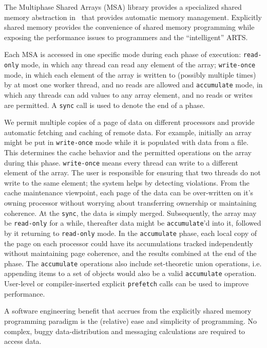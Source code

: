 
The Multiphase Shared Arrays (MSA) library provides a specialized
shared memory abstraction in \charmpp\ that provides automatic memory management.
Explicitly shared memory
provides the convenience of shared memory programming while exposing
the performance issues to programmers and the ``intelligent'' ARTS.

\newcommand{\accu}{\texttt{accumulate}\xspace }
\newcommand{\wo}{\texttt{write-once}\xspace }
\newcommand{\ro}{\texttt{read-only}\xspace }
\newcommand{\sync}{\texttt{sync}\xspace }
\newcommand{\pref}{\texttt{prefetch}\xspace }

Each MSA is accessed in one specific mode
during each phase of execution:
\ro mode, in which any thread can read
any element of the array;
\wo mode, in
which each element of the array is written to (possibly multiple
times) by at most one worker thread, and no reads are allowed
and \accu mode, in which any threads can add values to any array
element, and no reads or writes are permitted.
A \sync call is used to denote the end of a phase.

We permit multiple copies of a page of data on different
processors and provide automatic fetching and caching of remote data.
For example, initially an array might be put in
\wo mode while it is populated with data from a file.
This determines the cache
behavior and the
permitted operations on the array during this phase.
\wo means every thread can write to a different element of the array.
The user is responsible for ensuring that two threads do not write to
the same element; the system helps by detecting violations.
From the cache maintenance viewpoint, each
page of the data can be over-written on it's owning processor without
worrying about transferring ownership or maintaining coherence.
At the \sync, the data is simply merged.
Subsequently, the array may be \ro for a while, thereafter data
might be \accu'd into it, followed by it returning to \ro mode.  In
the \accu phase, each local copy of the page on each processor could
have its accumulations tracked independently without maintaining page
coherence, and the results combined at the end of the phase.
The \accu operations also include set-theoretic union
operations, i.e. appending items to a set of objects would also be a
valid \accu operation.
User-level or compiler-inserted explicit \pref calls can be used to
improve performance.

A software engineering benefit that accrues from the explicitly shared
memory programming paradigm is the (relative) ease and simplicity of
programming.  No complex, buggy data-distribution and messaging
calculations are required to access data.

